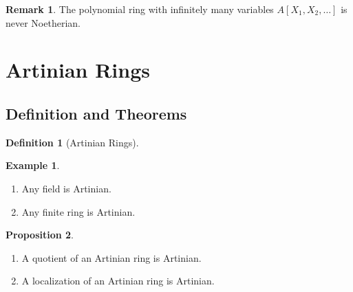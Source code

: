 \documentclass[a4paper]{book}
\theoremstyle{definition}
\newtheorem{definition}{Definition}[]
\newtheorem{example}{Example}[definition]
\newtheorem{proposition}[definition]{Proposition}
\newtheorem*{remark}{Remark}
\begin{document}
\begin{rembox}
    \begin{remark}
        The polynomial ring with infinitely many variables \(A[X_1, X_2, \ldots]\) is never Noetherian.
    \end{remark}
\end{rembox}

\newpage
\section{Artinian Rings}

\subsection*{Definition and Theorems}

\begin{defbox}
    \begin{definition}[Artinian Rings]
        
    \end{definition}
\end{defbox}

\begin{exmbox}
    \begin{example}
        \begin{enumerate}
            \item Any field is Artinian.
            \item Any finite ring is Artinian.
        \end{enumerate}
    \end{example}
\end{exmbox}

\begin{thmbox}
    \begin{proposition}
        \begin{enumerate}
            \item A quotient of an Artinian ring is Artinian.
            \item A localization of an Artinian ring is Artinian.
        \end{enumerate}
    \end{proposition}
\end{thmbox}
\end{document}
